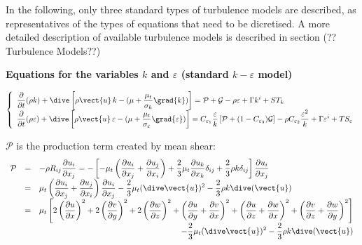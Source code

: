 \hspace*{1cm}

In the following, only three standard types of turbulence models are
described, as representatives of the types of equations that need to be
dicretised. A more detailed description of available turbulence models is
described in section (?? Turbulence Models??)

\clearpage \textbf{Equations for the variables $k$ and $\varepsilon$
(standard $k-\varepsilon$ model)}

\begin{equation}
\left\{
\begin{array}{l}
\displaystyle\frac{\partial }{\partial t}(\rho k)+\dive\left[ \rho \vect{u}%
\,k-(\mu +\frac{\mu _{t}}{\sigma _{k}}\grad{k})\right] =\mathcal{P}+\mathcal{%
G}-\rho \varepsilon +\Gamma k^{i}+ST_{k} \\
\displaystyle\frac{\partial }{\partial t}(\rho \varepsilon )+\dive\left[
\rho \vect{u}\,\varepsilon -(\mu +\frac{\mu _{t}}{\sigma _{\varepsilon }}%
\grad{\varepsilon})\right] =C_{\varepsilon _{1}}\frac{\varepsilon }{k}\left[
\mathcal{P}+(1-C_{\varepsilon _{3}})\mathcal{G}\right] -\rho C_{\varepsilon
_{2}}\frac{\varepsilon ^{2}}{k}+\Gamma \varepsilon ^{i}+TS_{\varepsilon }%
\end{array}%
\right.
\end{equation}

$\mathcal{P}$ is the production term created by mean shear:
\[
\begin{array}{rcl}
\mathcal{P} & = & \displaystyle -\rho R_{ij}\frac{\partial u_i}{\partial x_j}
= -\left[-\mu_t \left(\frac{\partial u_i}{\partial x_j} + \frac{\partial u_j%
}{\partial x_i}\right) +\frac{2}{3}\mu_t\frac{\partial u_k}{\partial x_k}%
\delta_{ij} +\frac{2}{3}\rho k\delta_{ij}\right] \frac{\partial u_i}{%
\partial x_j} \\
& = & \displaystyle \mu_t \left(\frac{\partial u_i}{\partial x_j} + \frac{%
\partial u_j}{\partial x_i}\right)\frac{\partial u_i}{\partial x_j} -\frac{2%
}{3}\mu_t(\dive\vect{u})^2-\frac{2}{3}\rho k \dive(\vect{u}) \\
& = & \displaystyle \mu_t \left[ 2\left(\frac{\partial u}{\partial x}%
\right)^2+ 2\left(\frac{\partial v}{\partial y}\right)^2+ 2\left(\frac{%
\partial w}{\partial z}\right)^2+ \left(\frac{\partial u}{\partial y}+\frac{%
\partial v}{\partial x}\right)^2+ \left(\frac{\partial u}{\partial z}+\frac{%
\partial w}{\partial x}\right)^2+ \left(\frac{\partial v}{\partial z}+\frac{%
\partial w}{\partial y}\right)^2 \right] \\
\multicolumn{3}{r}{\displaystyle -\frac{2}{3}\mu_t(\dive\vect{u})^2-\frac{2}{%
3}\rho k \dive(\vect{u})}%
\end{array}
\]

